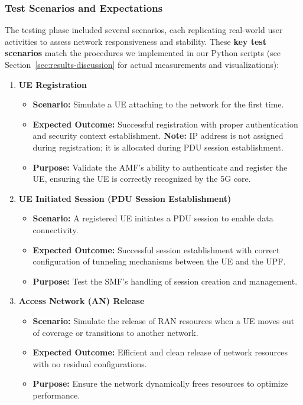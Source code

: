 \subsubsection{Test Scenarios and Expectations}

The testing phase included several scenarios, each replicating real-world user activities to assess network responsiveness and stability. These \textbf{key test scenarios} match the procedures we implemented in our Python scripts (see Section~\ref{sec:results-discussion} for actual measurements and visualizations):

\begin{enumerate}
    \item \textbf{UE Registration}
    \begin{itemize}
        \item \textbf{Scenario:} Simulate a UE attaching to the network for the first time.
        \item \textbf{Expected Outcome:} Successful registration with proper authentication and security context establishment. \textbf{Note:} IP address is not assigned during registration; it is allocated during PDU session establishment.
        \item \textbf{Purpose:} Validate the AMF's ability to authenticate and register the UE, ensuring the UE is correctly recognized by the 5G core.
    \end{itemize}


    \item \textbf{UE Initiated Session (PDU Session Establishment)}
    \begin{itemize}
        \item \textbf{Scenario:} A registered UE initiates a PDU session to enable data connectivity.
        \item \textbf{Expected Outcome:} Successful session establishment with correct configuration of tunneling mechanisms between the UE and the UPF.
        \item \textbf{Purpose:} Test the SMF’s handling of session creation and management.
    \end{itemize}

    \item \textbf{Access Network (AN) Release}
    \begin{itemize}
        \item \textbf{Scenario:} Simulate the release of RAN resources when a UE moves out of coverage or transitions to another network.
        \item \textbf{Expected Outcome:} Efficient and clean release of network resources with no residual configurations.
        \item \textbf{Purpose:} Ensure the network dynamically frees resources to optimize performance.
    \end{itemize}


\end{enumerate}
